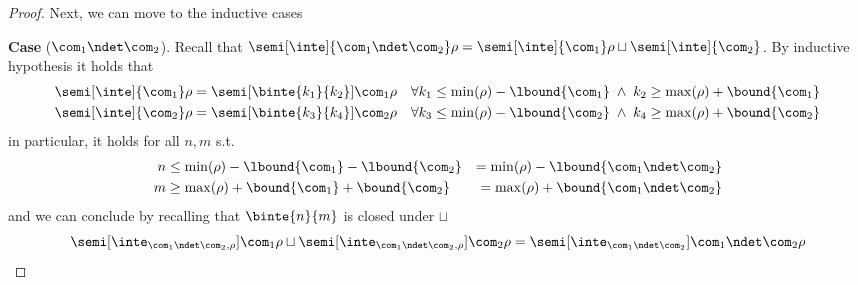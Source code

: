 \begin{proof}
  \medskip
  \noindent
  Next, we can move to the inductive cases
  
  \medskip
  
  \noindent
  \textbf{Case} (\(\com_1 \ndet \com_2\)).
  Recall that
  \({\semi[\inte]{\com_1 \ndet \com_2}\rho} =
  {\semi[\inte]{\com_1}\rho} \sqcup {\semi[\inte]{\com_2}}\). By
  inductive hypothesis it holds that
  \begin{align*}
    {\semi[\inte]{\com_1}\rho} & = \semi[\binte{k_1}{k_2}]{\com_1}\rho & \forall k_1 \leq \min(\rho) - \lbound{\com_1} \; \land \; k_2 \geq \max(\rho) + \bound{\com_1} \\
    {\semi[\inte]{\com_2}\rho} & = \semi[\binte{k_3}{k_4}]{\com_2}\rho & \forall k_3 \leq \min(\rho) - \lbound{\com_2} \; \land \; k_4 \geq \max(\rho) + \bound{\com_2}
  \end{align*}
  in particular, it holds for all \(n,m\) s.t.
  \begin{align*}
    n & \leq \min(\rho) - \lbound{\com_1} - \lbound{\com_2} & = \min(\rho) - \lbound{\com_1 \ndet \com_2} \\
    m & \geq \max(\rho) + \bound{\com_1} + \bound{\com_2} & = \max(\rho) + \bound{\com_1 \ndet \com_2}
  \end{align*}
  and we can conclude by recalling that \(\binte{n}{m}\) is closed
  under \(\sqcup\)
  \begin{equation*} {\semi[\inte_{\com_1 \ndet \com_2,
        \rho}]{\com_1}\rho} \sqcup {\semi[\inte_{\com_1 \ndet \com_2,
        \rho}]{\com_2}\rho} = {\semi[\inte_{\com_1\ndet\com_2}]{\com_1
        \ndet \com_2}\rho}
  \end{equation*}

  \medskip
  

\end{proof}
